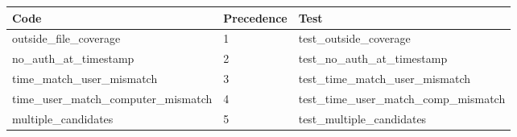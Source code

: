 \begin{tabular}{lll}
\toprule
Code & Precedence & Test \\
\midrule
outside_file_coverage & 1 & test_outside_coverage \\
no_auth_at_timestamp & 2 & test_no_auth_at_timestamp \\
time_match_user_mismatch & 3 & test_time_match_user_mismatch \\
time_user_match_computer_mismatch & 4 & test_time_user_match_comp_mismatch \\
multiple_candidates & 5 & test_multiple_candidates \\
\bottomrule
\end{tabular}
